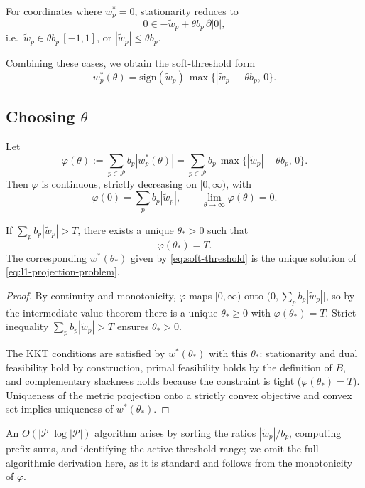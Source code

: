 \documentclass[11pt]{article}
\begin{document}
For coordinates where $w_p^\ast = 0$, stationarity reduces to
\[
0 \in -\tilde w_p + \theta b_p\,\partial|0|,
\]
i.e.\ $\tilde w_p \in \theta b_p\,[-1,1]$, or $|\tilde w_p|\le \theta b_p$.

Combining these cases, we obtain the soft-threshold form
\begin{equation}
  w_p^\ast(\theta)
  = \mathrm{sign}(\tilde w_p)\,\max\{|\tilde w_p| - \theta b_p,\,0\}.
  \label{eq:soft-threshold}
\end{equation}

\subsection{Choosing \texorpdfstring{$\theta$}{theta}}

Let
\[
\varphi(\theta)
:= \sum_{p\in\mathcal P} b_p |w_p^\ast(\theta)|
= \sum_{p\in\mathcal P} b_p\,\max\{|\tilde w_p| - \theta b_p,\,0\}.
\]
Then $\varphi$ is continuous, strictly decreasing on $[0,\infty)$, with
\[
\varphi(0) = \sum_p b_p|\tilde w_p|,\qquad
\lim_{\theta\to\infty} \varphi(\theta)=0.
\]

\begin{lemma}
If $\sum_p b_p|\tilde w_p| > T$, there exists a unique $\theta_\ast>0$ such that
\[
\varphi(\theta_\ast)=T.
\]
The corresponding $w^\ast(\theta_\ast)$ given by \eqref{eq:soft-threshold} is the unique solution of \eqref{eq:l1-projection-problem}.
\end{lemma}

\begin{proof}
By continuity and monotonicity, $\varphi$ maps $[0,\infty)$ onto $(0,\sum_p b_p|\tilde w_p|]$, so by the intermediate value theorem there is a unique $\theta_\ast\ge 0$ with $\varphi(\theta_\ast)=T$. Strict inequality $\sum_p b_p|\tilde w_p|>T$ ensures $\theta_\ast>0$.

The KKT conditions are satisfied by $w^\ast(\theta_\ast)$ with this $\theta_\ast$: stationarity and dual feasibility hold by construction, primal feasibility holds by the definition of $B$, and complementary slackness holds because the constraint is tight ($\varphi(\theta_\ast)=T$). Uniqueness of the metric projection onto a strictly convex objective and convex set implies uniqueness of $w^\ast(\theta_\ast)$.
\end{proof}

An $O(|\mathcal P|\log|\mathcal P|)$ algorithm arises by sorting the ratios $|\tilde w_p|/b_p$, computing prefix sums, and identifying the active threshold range; we omit the full algorithmic derivation here, as it is standard and follows from the monotonicity of $\varphi$.
\end{document}
